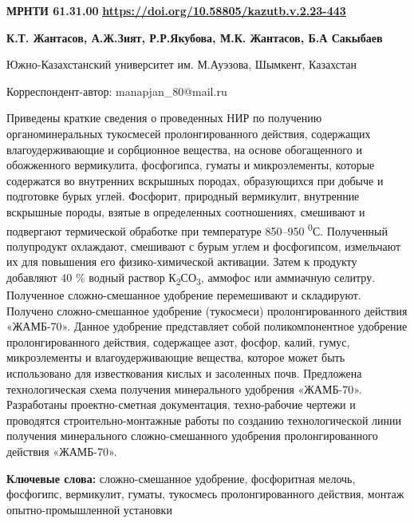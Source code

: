\newpage
{}
{\bfseries МРНТИ 61.31.00}
\hfill {\bfseries \href{https://doi.org/10.58805/kazutb.v.2.23-443}{https://doi.org/10.58805/kazutb.v.2.23-443}}


\begin{center}
{\bfseries К.Т. Жантасов, А.Ж.Зият, Р.Р.Якубова, М.К. Жантасов\envelope, Б.А Сакыбаев}

Южно-Казахстанский университет им. М.Ауэзова, Шымкент, Казахстан

\envelope Корреспондент-автор: manapjan\_80@mail.ru
\end{center}

Приведены краткие сведения о проведенных НИР по получению
органоминеральных тукосмесей пролонгированного действия, содержащих
влагоудерживающие и сорбционное вещества, на основе обогащенного и
обожженного вермикулита, фосфогипса, гуматы и микроэлементы, которые
содержатся во внутренних вскрышных породах, образующихся при добыче и
подготовке бурых углей. Фосфорит, природный вермикулит, внутренние
вскрышные породы, взятые в определенных соотношениях, смешивают и
подвергают термической обработке при температуре 850--950
\textsuperscript{0}С. Полученный полупродукт охлаждают, смешивают с
бурым углем и фосфогипсом, измельчают их для повышения его
физико-химической активации. Затем к продукту добавляют 40 \% водный
раствор К\textsubscript{2}СО\textsubscript{3}, аммофос или аммиачную
селитру. Полученное сложно-смешанное удобрение перемешивают и
складируют. Получено сложно-смешанное удобрение (тукосмеси)
пролонгированного действия «ЖАМБ-70». Данное удобрение представляет
собой поликомпонентное удобрение пролонгированного действия, содержащее
азот, фосфор, калий, гумус, микроэлементы и влагоудерживающие вещества,
которое может быть использовано для известкования кислых и засоленных
почв. Предложена технологическая схема получения минерального удобрения
«ЖАМБ-70». Разработаны проектно-сметная документация, техно-рабочие
чертежи и проводятся строительно-монтажные работы по созданию
технологической линии получения минерального сложно-смешанного удобрения
пролонгированного действия «ЖАМБ-70».

{\bfseries Ключевые слова:} сложно-смешанное удобрение, фосфоритная мелочь,
фосфогипс, вермикулит, гуматы, тукосмесь пролонгированного действия,
монтаж опытно-промышленной установки

